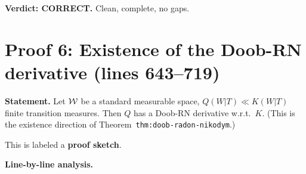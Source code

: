 \documentclass{article}
\begin{document}
\textbf{Verdict: CORRECT.}  Clean, complete, no gaps.

\section{Proof 6: Existence of the Doob-RN derivative (lines 643--719)}

\textbf{Statement.} Let $\mathcal{W}$ be a standard measurable space,
$Q(W|T)\ll K(W|T)$ finite transition measures.  Then $Q$ has a Doob-RN
derivative w.r.t.\ $K$.  (This is the existence direction of
Theorem~\texttt{thm:doob-radon-nikodym}.)

This is labeled a \textbf{proof sketch}.

\textbf{Line-by-line analysis.}
\end{document}
